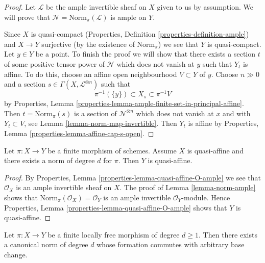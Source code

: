 \begin{proof}
Let $\mathcal{L}$ be the ample invertible sheaf on $X$ given to us
by assumption. We will prove that $\mathcal{N} = \text{Norm}_\pi(\mathcal{L})$
is ample on $Y$.

\medskip\noindent
Since $X$ is quasi-compact (Properties, Definition
\ref{properties-definition-ample}) and $X \to Y$ surjective
(by the existence of $\text{Norm}_\pi$)
we see that $Y$ is quasi-compact.
Let $y \in Y$ be a point. To finish the proof
we will show that there exists a section $t$ of some positive tensor
power of $\mathcal{N}$ which does not vanish at $y$ such that $Y_t$
is affine. To do this, choose an affine open neighbourhood $V \subset Y$
of $y$. Choose $n \gg 0$ and a section
$s \in \Gamma(X, \mathcal{L}^{\otimes n})$
such that
$$
\pi^{-1}(\{y\}) \subset X_s \subset \pi^{-1}V
$$
by
Properties, Lemma \ref{properties-lemma-ample-finite-set-in-principal-affine}.
Then $t = \text{Norm}_\pi(s)$ is a section of $\mathcal{N}^{\otimes n}$
which does not vanish at $x$ and with $Y_t \subset V$, see
Lemma \ref{lemma-norm-map-invertible}. Then $Y_t$
is affine by Properties, Lemma \ref{properties-lemma-affine-cap-s-open}.
\end{proof}

\begin{lemma}
\label{lemma-norm-quasi-affine}
Let $\pi : X \to Y$ be a finite morphism of schemes. Assume $X$ is quasi-affine
and there exists a norm of degree $d$ for $\pi$. Then $Y$ is quasi-affine.
\end{lemma}

\begin{proof}
By Properties, Lemma \ref{properties-lemma-quasi-affine-O-ample}
we see that $\mathcal{O}_X$ is an ample invertible sheaf on $X$.
The proof of Lemma \ref{lemma-norm-ample} shows that
$\text{Norm}_\pi(\mathcal{O}_X) = \mathcal{O}_Y$
is an ample invertible $\mathcal{O}_Y$-module. Hence
Properties, Lemma \ref{properties-lemma-quasi-affine-O-ample}
shows that $Y$ is quasi-affine.
\end{proof}

\begin{lemma}
\label{lemma-finite-locally-free-has-norm}
Let $\pi : X \to Y$ be a finite locally free morphism of degree $d \geq 1$.
Then there exists a canonical norm of degree $d$ whose formation commutes
with arbitrary base change.
\end{lemma}

